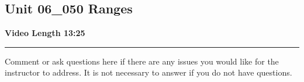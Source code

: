 \documentclass[letterpaper,12pt]{exam}
\newcommand{\unit}{Unit 06}
\begin{document}
\begin{questions}
\section*{\unit\_050 Ranges} %
\noindent \textbf{Video Length 13:25}
\begin{samepage}
    \begin{center}
    \rule{0.8\textwidth}{.4pt}
    \end{center}
	\question Comment or ask questions here if there are any issues you would like for the instructor to address.  It is not necessary to answer if you do not have questions.
	\vspace{30mm}
\end{samepage}

\end{questions}
\end{document}
